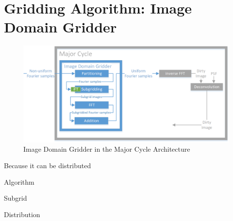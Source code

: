 \section{Gridding Algorithm: Image Domain Gridder}\label{idg}
\begin{figure}[h]
	\centering
	\includegraphics[width=0.80\linewidth]{./chapters/04.idg/major-minor-idg.png}
	\caption{Image Domain Gridder in the Major Cycle Architecture}
	\label{idg:system}
\end{figure}

Because it can be distributed

Algorithm

Subgrid

Distribution